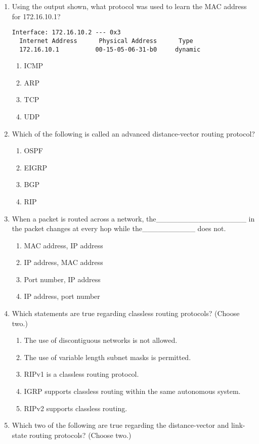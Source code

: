 \begin{enumerate}
\begin{enumerate}
    \begin{figure}
    \centering
    \caption{}
    \end{figure}
  \end{enumerate}
\item
  Using the output shown, what protocol was used to learn the MAC
  address for 172.16.10.1?

\begin{verbatim}
Interface: 172.16.10.2 --- 0x3
  Internet Address      Physical Address      Type
  172.16.10.1          00-15-05-06-31-b0     dynamic
\end{verbatim}

  \begin{enumerate}
  \tightlist
  \item
    ICMP
  \item
    ARP
  \item
    TCP
  \item
    UDP
  \end{enumerate}
\item
  Which of the following is called an advanced distance-vector routing
  protocol?

  \begin{enumerate}
  \tightlist
  \item
    OSPF
  \item
    EIGRP
  \item
    BGP
  \item
    RIP
  \end{enumerate}
\item
  When a packet is routed across a network,
  the\_\_\_\_\_\_\_\_\_\_\_\_\_\_\_\_\_ in the packet changes at every
  hop while the\_\_\_\_\_\_\_\_\_\_ does not.

  \begin{enumerate}
  \tightlist
  \item
    MAC address, IP address
  \item
    IP address, MAC address
  \item
    Port number, IP address
  \item
    IP address, port number
  \end{enumerate}
\item
  \protect\hypertarget{c09.xhtmlux5cux23Page_407}{}{}Which statements
  are true regarding classless routing protocols? (Choose two.)

  \begin{enumerate}
  \tightlist
  \item
    The use of discontiguous networks is not allowed.
  \item
    The use of variable length subnet masks is permitted.
  \item
    RIPv1 is a classless routing protocol.
  \item
    IGRP supports classless routing within the same autonomous system.
  \item
    RIPv2 supports classless routing.
  \end{enumerate}
\item
  Which two of the following are true regarding the distance-vector and
  link-state routing protocols? (Choose two.)


\end{enumerate}
